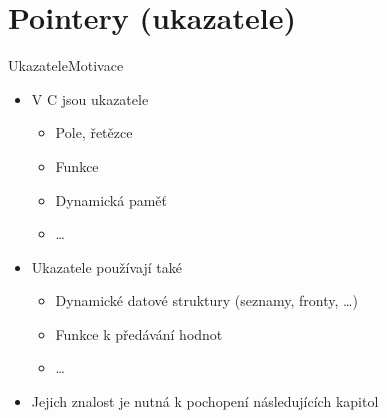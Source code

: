 
\section{Pointery (ukazatele)}
\frame{\sectionpage}

\begin{frame}{Ukazatele}{Motivace}

  \begin{itemize}
    \item V C jsou ukazatele
    \begin{itemize}
      \item Pole, řetězce
      \item Funkce
      \item Dynamická paměť
      \item \dots
    \end{itemize}

    \item Ukazatele používají také
    \begin{itemize}
      \item Dynamické datové struktury (seznamy, fronty, \dots)
      \item Funkce k předávání hodnot
      \item \dots
    \end{itemize}

    \pause

    \item Jejich znalost je nutná k pochopení následujících kapitol
  \end{itemize}

\end{frame}

